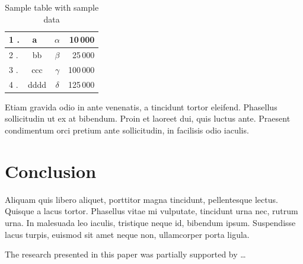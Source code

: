 \documentclass[10pt]{article}
\begin{document}
\begin{table}[!ht]
\centering
\caption{Sample table with sample data}
\label{tabl.1}
  \begin{tabular}{|l<{.}|c|>{$}c<{$}|r|}
                                 \hline
   1 & a~   & \alpha &  10\,000\\\hline
   2 & bb   & \beta  &  25\,000\\\hline
   3 & ccc  & \gamma & 100\,000\\\hline
   4 & dddd & \delta & 125\,000\\\hline
  \end{tabular}
\end{table}

Etiam gravida odio in ante venenatis, a tincidunt tortor eleifend. Phasellus sollicitudin ut ex at bibendum. Proin et laoreet dui, quis luctus ante. Praesent condimentum orci pretium ante sollicitudin, in facilisis odio iaculis. 

\section{Conclusion}

Aliquam quis libero aliquet, porttitor magna tincidunt, pellentesque lectus. Quisque a lacus tortor. Phasellus vitae mi vulputate, tincidunt urna nec, rutrum urna. In malesuada leo iaculis, tristique neque id, bibendum ipsum. Suspendisse lacus turpis, euismod sit amet neque non, ullamcorper porta ligula.

\begin{acknowledgements}
 The research presented in this paper was partially supported by \ldots
\end{acknowledgements}





\end{document}
